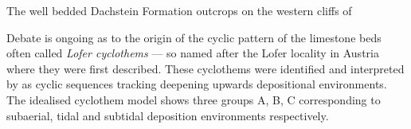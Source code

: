 \begin{marginfigure}
\caption{The well bedded Dachstein Formation outcrops on the western cliffs of  }
\label{fig:dachstein}
\end{marginfigure}

Debate is ongoing as to the origin of the cyclic pattern of the limestone beds often called \emph{Lofer cyclothems} --- so named after the Lofer locality in Austria where they were first described. 
These cyclothems were identified and interpreted by \citet{fisher1964lofer} as cyclic sequences tracking deepening upwards depositional environments.
The idealised cyclothem model shows three groups A, B, C corresponding to  subaerial, tidal and subtidal deposition environments respectively.  

